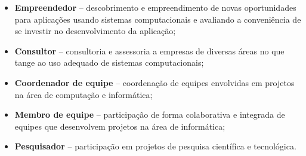 \begin{itemize}
    \item \textbf{Empreendedor} – descobrimento e empreendimento de novas oportunidades para aplicações usando sistemas computacionais e avaliando a conveniência de se investir no desenvolvimento da aplicação;
    \item \textbf{Consultor} – consultoria e assessoria a empresas de diversas áreas no que tange ao uso adequado de sistemas computacionais;
    \item \textbf{Coordenador de equipe} – coordenação de equipes envolvidas em projetos na área de computação e informática;
    \item \textbf{Membro de equipe} – participação de forma colaborativa e integrada de equipes que desenvolvem projetos na área de informática;
    \item \textbf{Pesquisador} – participação em projetos de pesquisa científica e tecnológica. 
\end{itemize}